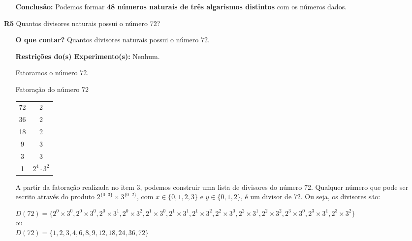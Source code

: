 \documentclass[a4paper,12pt]{article}
\begin{document}
\begin{enumerate}
\begin{itemize}
    \item[\ding{178}] \textbf{Conclusão:} Podemos formar \textbf{48 números naturais de três algarismos distintos} com os números dados.
  \end{itemize}
  
\item[\textbf{R5}] Quantos divisores naturais possui o número 72?
   \begin{itemize}
    \item[\ding{172}] \textbf{O que contar?} Quantos divisores naturais possui o número 72.
    
    \item[\ding{173}] \textbf{Restrições do(s) Experimento(s):} Nenhum.

    \item[\ding{174}] Fatoramos o número 72.
    
      \begin{table}[H]
        \centering
        Fatoração do número 72 \\
        \begin{tabular}{c|c}
     	  72 & 2 \\
	      36 & 2 \\
          18 & 2 \\
          9 & 3 \\          
          3 & 3 \\ \hline
          1 & $2^4 \cdot 3^2$ \\     
       \end{tabular}
       \label{fatoracao-numero-72}       
     \end{table}

    
    \item[\ding{175}] A partir da fatoração realizada no item 3, podemos construir uma lista de divisores do número 72. Qualquer número que pode ser escrito através do produto $2^{\{0..3\}} \times 3^{\{0..2\}} $, com $x \in \{0,1,2,3\}$ e $y \in \{0,1,2\}$, é um divisor de 72. Ou seja, os divisores são: 

      \begin{center}
     	$D(72)=\{2^0 \times 3^0,
     	2^0 \times 3^0,
     	2^0 \times 3^1,
     	2^0 \times 3^2,
     	2^1 \times 3^0,
     	2^1 \times 3^1,
     	2^1 \times 3^2,
     	2^2 \times 3^0,
     	2^2 \times 3^1,
     	2^2 \times 3^2,
     	2^3 \times 3^0,
     	2^3 \times 3^1,
     	2^3 \times 3^2
     	\}$ \\
     	ou \\
     	$D(72)=\{
        1,2,3,4,6,
        8,9,12,18,24,
        36,72\}
     	$
     \end{center}
        

\end{itemize}
\end{enumerate}
\end{document}
